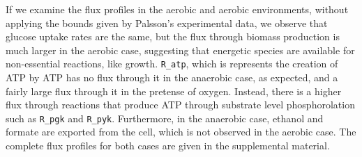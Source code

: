 \documentclass{article}
\begin{document}
If we examine the flux profiles in the aerobic and aerobic environments, without applying the bounds given by Palsson's experimental data, we observe that glucose uptake rates are the same, but the flux through biomass production is much larger in the aerobic case, suggesting that energetic species are available for non-essential reactions, like growth. \texttt{R\_atp}, which is represents the creation of ATP by ATP  has no flux through it in the anaerobic case, as expected, and a fairly large flux through it in the pretense of oxygen. Instead, there is a higher flux through reactions that produce ATP through substrate level phosphorolation such as \texttt{R\_pgk} and \texttt{R\_pyk}. Furthermore, in the anaerobic case, ethanol and formate are exported from the cell, which is not observed in the aerobic case. The complete flux profiles for both cases are given in the supplemental material.   
   
\end{document}
